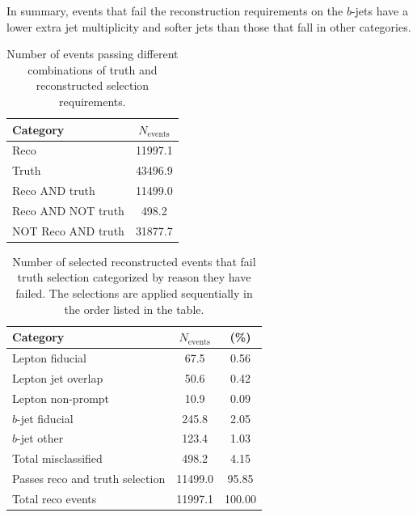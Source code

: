 In summary, events that fail the reconstruction requirements on the $b$-jets have a lower extra jet multiplicity and 
softer jets than those that fall in other categories.   



\begin{table}
\begin{center}
\begin{tabular}{|l|c|}
\hline
Category & $N_{\textrm{events}}$\\
\hline
Reco & 11997.1 \\
Truth & 43496.9 \\
Reco AND truth & 11499.0 \\
Reco AND NOT truth & 498.2 \\
NOT Reco AND truth & 31877.7 \\
\hline
\end{tabular}
\end{center}
\caption{Number of events passing different combinations of truth and reconstructed selection requirements.}
\label{t:truthrecoev}
\end{table}

\begin{table}
\begin{center}
\begin{tabular}{|l|cc|}
\hline
Category & $N_{\textrm{events}}$ & (\%) \\
\hline
Lepton fiducial & 67.5 & 0.56 \\
Lepton jet overlap & 50.6 & 0.42 \\
Lepton non-prompt & 10.9 & 0.09 \\
$b$-jet fiducial & 245.8 & 2.05 \\
$b$-jet other & 123.4 & 1.03 \\
\hline
Total misclassified & 498.2 & 4.15 \\
\hline \hline
Passes reco and truth selection & 11499.0 & 95.85 \\
\hline
Total reco events & 11997.1 & 100.00 \\
\hline
\end{tabular}
\end{center}
\caption{Number of selected reconstructed events that fail truth selection categorized by reason they have failed.  The selections are applied sequentially in the order listed in the table.}
\label{t:reconottruth}
\end{table}

